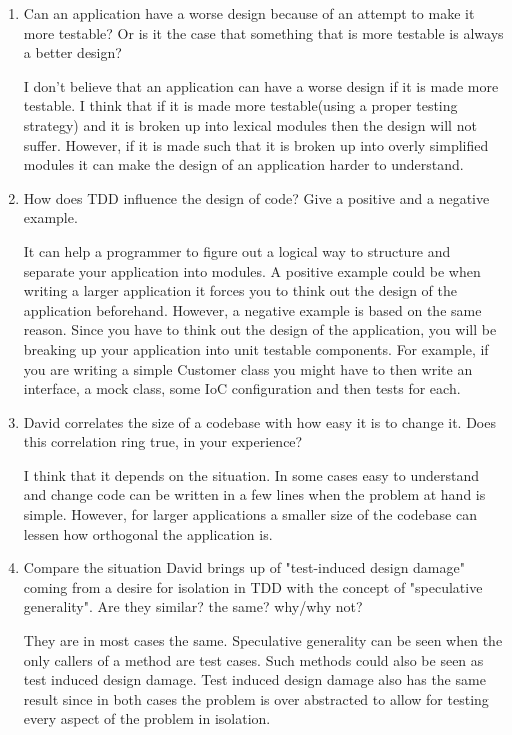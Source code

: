 \begin{enumerate}
\begin{enumerate}
			\item Can an application have a worse design because of an attempt to make it more testable? Or is it the case that something that is more testable is always a better design?

				I don't believe that an application can have a worse design if it is made more testable.  I think that if it is made more testable(using a proper testing strategy) and it is broken up into lexical modules then the design will not suffer.  However, if it is made such that it is broken up into overly simplified modules it can make the design of an application harder to understand.

			\item How does TDD influence the design of code? Give a positive and a negative example.

				It can help a programmer to figure out a logical way to structure and separate your application into modules. A positive example could be when writing a larger application it forces you to think out the design of the application beforehand.  However, a negative example is based on the same reason.  Since you have to think out the design of the application, you will be breaking up your application into unit testable components.  For example, if you are writing a simple Customer class you might have to then write an interface, a mock class, some IoC configuration and then tests for each.

			\item David correlates the size of a codebase with how easy it is to change it. Does this correlation ring true, in your experience?

				I think that it depends on the situation.  In some cases easy to understand and change code can be written in a few lines when the problem at hand is simple.  However, for larger applications a smaller size of the codebase can lessen how orthogonal the application is. 

			\item Compare the situation David brings up of "test-induced design damage" coming from a desire for isolation in TDD with the concept of "speculative generality". Are they similar? the same? why/why not?

				They are in most cases the same.  Speculative generality can be seen when the only callers of a method are test cases.  Such methods could also be seen as test induced design damage.  Test induced design damage also has the same result since in both cases the problem is over abstracted to allow for testing every aspect of the problem in isolation.


\end{enumerate}
\end{enumerate}
